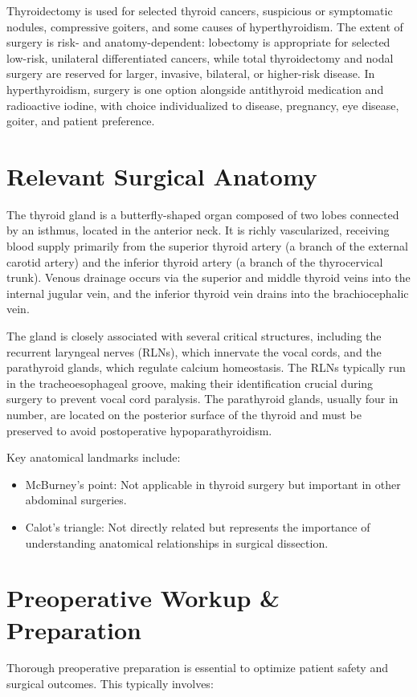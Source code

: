 Thyroidectomy is used for selected thyroid cancers, suspicious or symptomatic nodules, compressive goiters, and some causes of hyperthyroidism. The extent of surgery is risk- and anatomy-dependent: lobectomy is appropriate for selected low-risk, unilateral differentiated cancers, while total thyroidectomy and nodal surgery are reserved for larger, invasive, bilateral, or higher-risk disease. In hyperthyroidism, surgery is one option alongside antithyroid medication and radioactive iodine, with choice individualized to disease, pregnancy, eye disease, goiter, and patient preference.

\section*{Relevant Surgical Anatomy}
The thyroid gland is a butterfly-shaped organ composed of two lobes connected by an isthmus, located in the anterior neck. It is richly vascularized, receiving blood supply primarily from the superior thyroid artery (a branch of the external carotid artery) and the inferior thyroid artery (a branch of the thyrocervical trunk). Venous drainage occurs via the superior and middle thyroid veins into the internal jugular vein, and the inferior thyroid vein drains into the brachiocephalic vein.

The gland is closely associated with several critical structures, including the recurrent laryngeal nerves (RLNs), which innervate the vocal cords, and the parathyroid glands, which regulate calcium homeostasis. The RLNs typically run in the tracheoesophageal groove, making their identification crucial during surgery to prevent vocal cord paralysis. The parathyroid glands, usually four in number, are located on the posterior surface of the thyroid and must be preserved to avoid postoperative hypoparathyroidism.

Key anatomical landmarks include:
\begin{itemize}
  \item McBurney's point: Not applicable in thyroid surgery but important in other abdominal surgeries.
  \item Calot's triangle: Not directly related but represents the importance of understanding anatomical relationships in surgical dissection.
\end{itemize}

\section*{Preoperative Workup \& Preparation}
Thorough preoperative preparation is essential to optimize patient safety and surgical outcomes. This typically involves:

